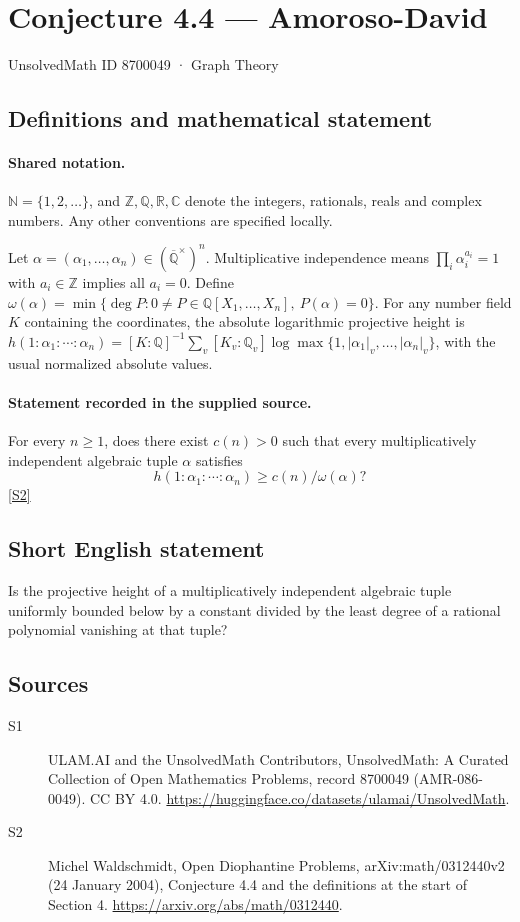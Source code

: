 \documentclass[11pt]{article}
\newcommand{\sref}[2]{\hyperlink{source:#1:#2}{[S#2]}}
\begin{document}
\setcounter{section}{8700048}
\section{Conjecture 4.4 — Amoroso-David}\label{8700049}
{\small\sffamily UnsolvedMath ID 8700049 · Graph Theory}
\subsection{Definitions and mathematical statement}

\paragraph{Shared notation.}$\mathbb N=\{1,2,\ldots\}$, and $\mathbb Z,\mathbb Q,\mathbb R,\mathbb C$ denote the integers, rationals, reals and complex numbers. Any other conventions are specified locally.


Let $\alpha=(\alpha_1,\ldots,\alpha_n)\in(\overline{\mathbb Q}^{\times})^n$. Multiplicative independence means $\prod_i\alpha_i^{a_i}=1$ with $a_i\in\mathbb Z$ implies all $a_i=0$. Define $\omega(\alpha)=\min\{\deg P:0\ne P\in\mathbb Q[X_1,\ldots,X_n],\ P(\alpha)=0\}$. For any number field $K$ containing the coordinates, the absolute logarithmic projective height is $h(1:\alpha_1:\cdots:\alpha_n)=[K:\mathbb Q]^{-1}\sum_v[K_v:\mathbb Q_v]\log\max\{1,|\alpha_1|_v,\ldots,|\alpha_n|_v\}$, with the usual normalized absolute values.
\paragraph{Statement recorded in the supplied source.}
For every $n\ge1$, does there exist $c(n)>0$ such that every multiplicatively independent algebraic tuple $\alpha$ satisfies \[h(1:\alpha_1:\cdots:\alpha_n)\ge c(n)/\omega(\alpha)?\] \sref{8700049}{2}
\subsection{Short English statement}
Is the projective height of a multiplicatively independent algebraic tuple uniformly bounded below by a constant divided by the least degree of a rational polynomial vanishing at that tuple?
\subsection{Sources}
\begin{description}
\item[\hypertarget{source:8700049:1}{S1}] ULAM.AI and the UnsolvedMath Contributors, UnsolvedMath: A Curated Collection of Open Mathematics Problems, record 8700049 (AMR-086-0049). CC BY 4.0. \url{https://huggingface.co/datasets/ulamai/UnsolvedMath}.
\item[\hypertarget{source:8700049:2}{S2}] Michel Waldschmidt, Open Diophantine Problems, arXiv:math/0312440v2 (24 January 2004), Conjecture 4.4 and the definitions at the start of Section 4. \url{https://arxiv.org/abs/math/0312440}.
\end{description}
\label{end:8700049}
\end{document}
